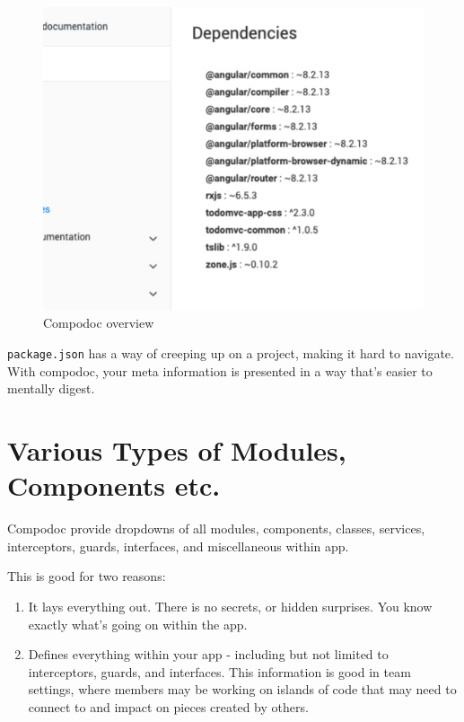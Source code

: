 \begin{figure}
\caption{Compodoc overview}
\includegraphics[width=414pt]{graphics/compodoc/dependencies/compo-dependencies-screenshot.pdf}
\end{figure}


\lstinline{package.json} has a way of creeping up on a project, making it hard to navigate. With compodoc, your meta information is presented in a way that's easier to mentally digest. 

\section{Various Types of Modules, Components etc.}
Compodoc provide dropdowns of all modules, components, classes, services, interceptors, guards, interfaces, and miscellaneous within app.

This is good for two reasons: 
\begin{enumerate}
  \item It lays everything out. There is no secrets, or hidden surprises. You know exactly what's going on within the app. 
  \item Defines everything within your app - including but not limited to interceptors, guards, and interfaces. This information is good in team settings, where members may be working on islands of code that may need to connect to and impact on pieces created by others. 
\end{enumerate}

